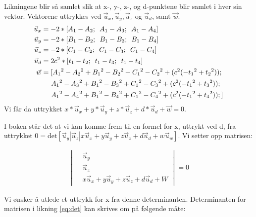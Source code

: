 Likningene blir så samlet slik at x-, y-, z-, og d-punktene blir samlet i hver sin vektor. Vektorene uttrykkes ved ${\vec u_x}, {\vec u_y}, {\vec u_z}$ og  ${\vec u_d}$, samt $\vec{w}$. 
\begin{align}
{\vec u_x} &=  - 2*[{A_1} - {A_2};\enspace {A_1} - {A_3}; \enspace{A_1} - {A_4}] \nonumber \\
{\vec u_y} &=  - 2*[{B_1} - {B_2}; \enspace{B_1} - {B_3}; \enspace{B_1} - {B_4}] \nonumber \\
{\vec u_z} &=  - 2*[{C_1} - {C_2}; \enspace{C_1} - {C_3}; \enspace{C_1} - {C_4}] \nonumber \\
{\vec u_d} &=  2c^2*[{t_1} - {t_2}; \enspace{t_1} - {t_3}; \enspace{t_1} - {t_4}] \nonumber \\
{\vec w}  &= [{A_1}^2 - {A_2}^2 + {B_1}^2 - {B_2}^2 + {C_1}^2 - {C_2}^2 + ({c^2}( - {t_1}^2 + {t_2}^2)); \nonumber \\
&\hskip 1.4em  {A_1}^2 - {A_3}^2 + {B_1}^2 - {B_3}^2 + {C_1}^2 - {C_3}^2 + ({c^2}( - {t_1}^2 + {t_3}^2)); \nonumber \\ 
&\hskip 1.4em {A_1}^2 - {A_4}^2 + {B_1}^2 - {B_4}^2 + {C_1}^2 - {C_4}^2 + ({c^2}( - {t_1}^2 + {t_4}^2));]
\end{align}
Vi får da uttrykket $x*{\vec u_x} + y*{\vec u_y} + z*{\vec u_z} + d*{\vec u_d} + {\vec w} = 0$. 


I boken står det at vi kan komme frem til en formel for x, uttrykt ved d, fra uttrykket $0=\text{det}[\vec{u}_y | \vec{u}_z | x\vec{u}_x + y\vec{u}_y + z\vec{u}_z + d\vec{u}_d + w\vec{u}_w]$. Vi setter opp matrisen: 

\begin{align} \label{eq:det}
	\begin{vmatrix}
	&\vec{u}_y\\
	&\vec{u}_z \\
	&x\vec{u}_x + y\vec{u}_y + z\vec{u}_z + d\vec{u}_d + W
	\end{vmatrix}
	=0
\end{align}

Vi ønsker å utlede et uttrykk for x fra denne determinanten. Determinanten for matrisen i likning \ref{eq:det} kan skrives om på følgende måte: 


